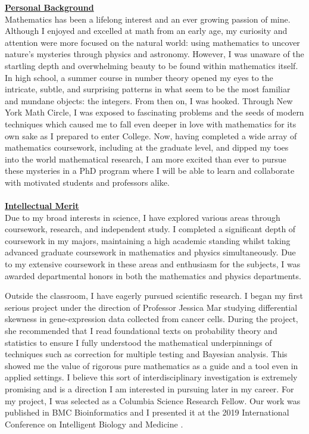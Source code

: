 \documentclass[11pt]{amsart}
\begin{document}
\thispagestyle{empty}

\noindent
\underline{\textbf{Personal Background}}
\\
Mathematics has been a lifelong interest and an ever growing passion of mine. Although I enjoyed and excelled at math from an early age, my curiosity and attention were more focused on the natural world: using mathematics to uncover nature's mysteries through physics and astronomy. However, I was unaware of the startling depth and overwhelming beauty to be found within mathematics itself. In high school, a summer course in number theory opened my eyes to the intricate, subtle, and surprising patterns in what seem to be the most familiar and mundane objects: the integers. From then on, I was hooked. Through New York Math Circle, I was exposed to fascinating problems and the seeds of modern techniques which caused me to fall even deeper in love with mathematics for its own sake as I prepared to enter College. Now, having completed a wide array of mathematics coursework, including at the graduate level, and dipped my toes into the world mathematical research, I am more excited than ever to pursue these mysteries in a PhD program where I will be able to learn and collaborate with motivated students and professors alike. 
\\
\\
\noindent
\underline{\textbf{Intellectual Merit}}
\\
Due to my broad interests in science, I have explored various areas through coursework, research, and independent study. I completed a significant depth of coursework in my majors,  maintaining a high academic standing whilst taking advanced graduate coursework in mathematics and physics simultaneously. Due to my extensive coursework in these areas and enthusiasm for the subjects, I was awarded departmental honors in both the mathematics and physics departments. 
\par 
Outside the classroom, I have eagerly pursued scientific research. I began my first serious project under the direction of Professor Jessica Mar studying differential skewness in gene-expression data collected from cancer cells. During the project, she recommended that I read foundational texts on probability theory and statistics to ensure I fully understood the mathematical underpinnings of techniques such as correction for multiple testing and Bayesian analysis. This showed me the value of rigorous pure mathematics as a guide and a tool even in applied settings. I believe this sort of interdisciplinary investigation is extremely promising and is a direction I am interested in pursuing later in my career. For my project, I was selected as a Columbia Science Research Fellow. Our work was published in BMC Bioinformatics and I presented it at the 2019 International Conference on Intelligent Biology and Medicine \cite{skew}.
\end{document}
